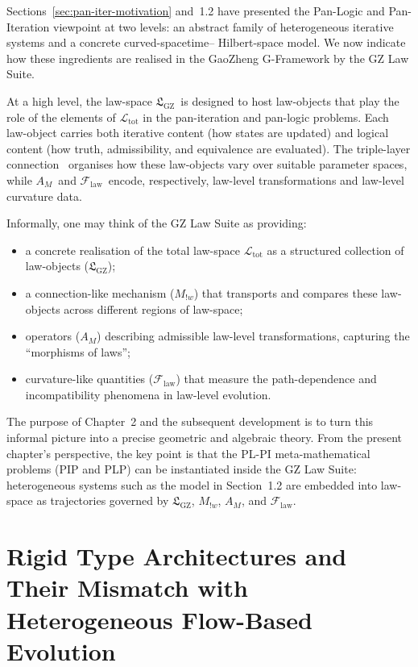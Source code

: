 \documentclass[11pt]{book}
\theoremstyle{plain}
\theoremstyle{definition}
\newcommand{\GZLS}{\ensuremath{\mathfrak{L}_{\mathrm{GZ}}}}       \newcommand{\GZLT}{\ensuremath{M_{!w}}}                           \newcommand{\GZLOC}{\ensuremath{A_M}}                             \newcommand{\GZLCurv}{\ensuremath{\mathcal{F}_{\mathrm{law}}}}
\begin{document}
Sections~\ref{sec:pan-iter-motivation} and~1.2 have presented the
Pan-Logic and Pan-Iteration viewpoint at two levels: an abstract family
of heterogeneous iterative systems and a concrete curved-spacetime–
Hilbert-space model. We now indicate how these ingredients are realised
in the GaoZheng G-Framework by the GZ Law Suite.

At a high level, the law-space \GZLS\ is designed to host law-objects
that play the role of the elements of $\mathcal{L}_{\mathrm{tot}}$ in
the pan-iteration and pan-logic problems. Each law-object carries both
iterative content (how states are updated) and logical content (how
truth, admissibility, and equivalence are evaluated). The triple-layer
connection \GZTLC\ organises how these law-objects vary over suitable
parameter spaces, while \GZLOC\ and \GZLCurv\ encode, respectively,
law-level transformations and law-level curvature data.

Informally, one may think of the GZ Law Suite as providing:

\begin{itemize}
  \item a concrete realisation of the total law-space
    $\mathcal{L}_{\mathrm{tot}}$ as a structured collection of
    law-objects (\GZLS);
  \item a connection-like mechanism (\GZLT) that transports and compares
    these law-objects across different regions of law-space;
  \item operators (\GZLOC) describing admissible law-level
    transformations, capturing the ``morphisms of laws'';
  \item curvature-like quantities (\GZLCurv) that measure the
    path-dependence and incompatibility phenomena in law-level
    evolution.
\end{itemize}

The purpose of Chapter~2 and the subsequent development is to turn this
informal picture into a precise geometric and algebraic theory. From
the present chapter's perspective, the key point is that the PL-PI
meta-mathematical problems (PIP and PLP) can be instantiated inside the
GZ Law Suite: heterogeneous systems such as the model in Section~1.2
are embedded into law-space as trajectories governed by \GZLS,
\GZLT, \GZLOC, and \GZLCurv.



\section[Rigid Type Architectures and Heterogeneous Flow-Based Evolution]{Rigid Type Architectures and Their Mismatch with Heterogeneous Flow-Based Evolution}
\end{document}

